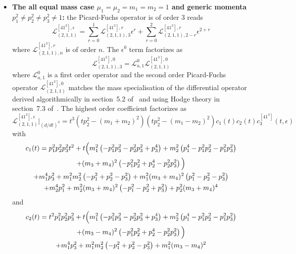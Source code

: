 \documentclass[a4paper,12pt]{article}
\numberwithin{equation}{section}
\numberwithin{figure}{subsection}
\theoremstyle{plain}
\theoremstyle{plain}
\theoremstyle{definition}
\theoremstyle{plain}
\theoremstyle{remark}
\theoremstyle{plain}
\begin{document}
\begin{itemize}
  \item \textbf{ The all equal mass case
  $\mu_1=\mu_2=m_1=m_2=1$ and generic momenta $p_1^2\neq p_2^2\neq
  p_3^2\neq 1$:} the Picard-Fuchs operator is of order 3
  reads
  \begin{equation}
       \mathscr{L}_{(2,1,1)}^{[41^3],\epsilon}=\sum_{r=0}^1
       \mathscr{L}_{(2,1,1),3}^{[41^3],r} \epsilon^r+ \sum_{r=0}^2   \mathscr{L}_{(2,1,1),2-r}^{[41^3],r} \epsilon^{2+r}
     \end{equation}
     where $ \mathscr{L}_{(2,1,1),n}^{[41^3],r}$  is of order $n$. The
     $\epsilon^0$ term factorizes as
     \begin{equation}
           \mathscr{L}_{(2,1,1),3}^{[41^3],0}=\mathscr{L}_{a,1}^0 \mathscr{L}_{(2,1,1)}^{[41^3],0}      
         \end{equation}
         where $\mathscr{L}_{a,1}^0$ is a first order operator   and the second order
         Picard-Fuchs operator  $\mathscr{L}_{(2,1,1)}^{[41^3] ,0}
         $ matches the mass specialisation of the differential
         operator derived algorithmically in section~5.2
         of~\cite{Lairez:2022zkj} and using Hodge theory in
         section~7.3 of~\cite{DHPPV}.
         The highest order coefficient factorizes as
         \begin{equation}
                     \mathscr{L}_{(2,1,1)}^{[41^3],\epsilon}\Big|_{(d/dt)^3}=t^3(tp_2^2-(m_1+m_2)^2)(tp_2^2-(m_1-m_2)^2) c_1(t) c_2(t)c^{[41^3]}_3(t,\epsilon)   
                   \end{equation}
                   with
                   \begin{multline}
   c_1(t)=   p_{1}^2 p_{2}^2 p_{3}^2 t^2 +t\Big(m_{1}^2 \left(-p_{1}^2 p_{3}^2-p_{2}^2 p_{3}^2+p_{3}^4\right)+m_{2}^2 \left(p_{1}^4-p_{1}^2
   p_{2}^2-p_{1}^2 p_{3}^2\right)\cr+(m_{3}+m_{4})^2
 \left(-p_{1}^2 p_{2}^2+p_{2}^4-p_{2}^2
   p_{3}^2\right)\Big)\cr
+m_{1}^4 p_{3}^2+m_{1}^2 m_{2}^2 \left(-p_{1}^2+p_{2}^2-p_{3}^2\right)+m_{1}^2 (m_{3}+m_{4})^2
   \left(p_{1}^2-p_{2}^2-p_{3}^2\right)\cr+m_{2}^4 p_{1}^2+m_{2}^2 (m_{3}+m_{4})^2
   \left(-p_{1}^2-p_{2}^2+p_{3}^2\right)+p_{2}^2 (m_{3}+m_{4})^4
 \end{multline}
 and
 \begin{multline}
   c_2(t)=t^2 p_{1}^2 p_{2}^2 p_{3}^2+t\Big(m_{1}^2 \left(-p_{1}^2 p_{3}^2-p_{2}^2 p_{3}^2+p_{3}^4\right)+m_{2}^2 \left(p_{1}^4-p_{1}^2
   p_{2}^2-p_{1}^2 p_{3}^2\right)\cr+(m_{3}-m_{4})^2 \left(-p_{1}^2 p_{2}^2+p_{2}^4-p_{2}^2 p_{3}^2\right)\Big)\cr
    +m_{1}^4 p_{3}^2+m_{1}^2 m_{2}^2 \left(-p_{1}^2+p_{2}^2-p_{3}^2\right)+m_{1}^2 (m_{3}-m_{4})^2

\end{multline}
\end{itemize}
\end{document}
